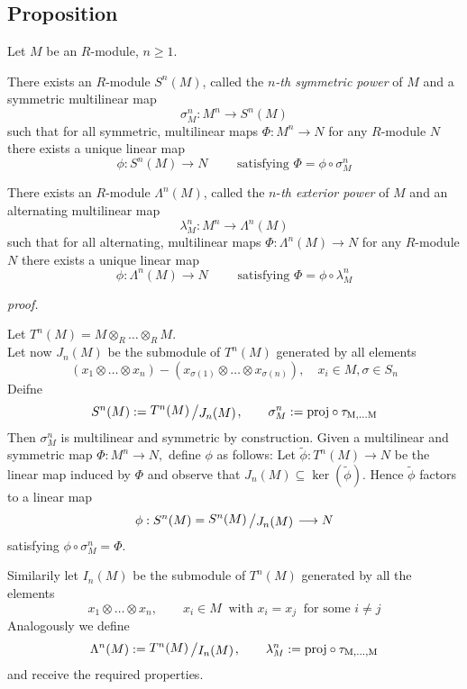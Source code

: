 \documentclass[12pt]{book}
\newcommand{\slant}[2]{{\raisebox{.1em}{$#1$}\left/\raisebox{-.1em}{$#2$}\right.}}
\begin{document}
\begin{spacing}{1.3}
\subsection{Proposition} %
Let $M$ be an $R$-module, $n \geqslant 1$. 
\begin{compactenum}
\item There exists an $R$-module $S^n(M)$, called the $n$\textit{-th symmetric power} of $M$ and a symmetric multilinear map
$$\sigma_M^n:M^n \longrightarrow S^n(M)$$
such that for all symmetric, multilinear maps $\Phi: M^n \longrightarrow N$ for any $R$-module $N$ there exists a unique linear map
$$\phi:S^n(M) \longrightarrow N \qquad \textrm{ satisfying } \Phi = \phi \circ \sigma_M^n$$
\item There exists an $R$-module $\Lambda^n(M)$, called the $n$-\textit{th exterior power} of $M$ and an alternating multilinear map 
$$\lambda_M^n: M^n \longrightarrow \Lambda^n(M)$$
such that for all alternating, multilinear maps $\Phi: \Lambda^n(M) \longrightarrow N$ for any $R$-module $N$ there exists a unique linear map 
$$\phi:\Lambda^n(M) \longrightarrow N \qquad \textrm{ satisfying } \Phi=\phi \circ \lambda_M^n$$
\end{compactenum}
\textit{proof.}
\begin{compactenum}
\item Let $T^n(M)=M \otimes_R \ldots \otimes_R M$.\\
Let now $J_n(M)$ be the submodule of $T^n(M)$ generated by all elements
$$\left(x_1 \otimes \ldots \otimes x_n\right)-\left(x_{\sigma(1)} \otimes \ldots \otimes x_{\sigma(n)}\right), \quad x_i \in M, \sigma \in S_n$$
Deifne $$S^n(M):=\slant{T^n(M)}{J_n(M)}, \qquad \sigma_M^n := \rm{proj} \circ \tau_{M,\ldots M}$$
Then $\sigma_M^n$ is multilinear and symmetric by construction. Given a multilinear and symmetric map
$\Phi: M^n \longrightarrow N,$
define $\phi$ as follows: Let $\tilde{\phi}:T^n(M) \longrightarrow N$ be the linear map induced by $\Phi$ and observe that $J_n(M) \subseteq \ker(\tilde{\phi})$. Hence $\tilde{\phi}$ factors to a linear map 
$$\phi: S^n(M)=\slant{S^n(M)}{J_n(M)} \longrightarrow N$$
satisfying $\phi \circ \sigma_M^n=\Phi$. 
\item Similarily let $I_n(M)$ be the submodule of $T^n(M)$ generated by all the elements
$$x_1 \otimes \ldots \otimes x_n, \qquad x_i \in M \ \textrm{ with } x_i =x_j \ \textrm{ for some }i \neq j$$
Analogously we define 
$$\Lambda^n(M):=\slant{T^n(M)}{I_n(M)}, \qquad \lambda_M^n:= \rm{proj} \circ \tau_{M, \ldots, M}$$
and receive the required properties.
\end{compactenum}


\end{spacing}
\end{document}
